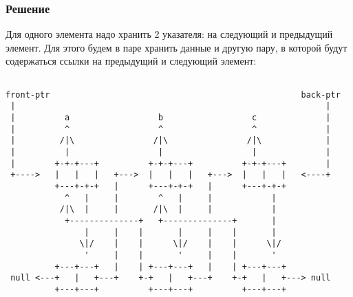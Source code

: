 \documentclass[10pt,a4paper]{article}
\begin{document}
\subsubsection*{Решение}
Для одного элемента надо хранить 2 указателя: на следующий и
предыдущий элемент. Для этого будем в паре хранить данные и другую
пару, в которой будут содержаться ссылки на предыдущий и следующий
элемент:
\begin{lstlisting}

front-ptr                                                   back-ptr
 |                                                               |
 |          a                  b                  c              |
 |          ^                  ^                  ^              |
 |         /|\                /|\                /|\             |
 |          |                  |                  |              |
 |        +-+-+---+          +-+-+---+          +-+-+---+        |
 +---->   |   |   |   +--->  |   |   |   +--->  |   |   |   <----+
          +---+-+-+   |      +---+-+-+   |      +---+-+-+
            ^   |     |        ^   |     |            |
           /|\  |     |       /|\  |     |            |
            +--------------+   +--------------+       |
                |     |    |       |     |    |       |
               \|/    |    |      \|/    |    |      \|/
                '     |    |       '     |    |       '
          +---+---+   |    | +---+---+   |    | +---+---+
 null <---+   |   +---+    +-+   |   +---+    +-+   |   +---> null
          +---+---+          +---+---+          +---+---+

\end{lstlisting}
\end{document}
